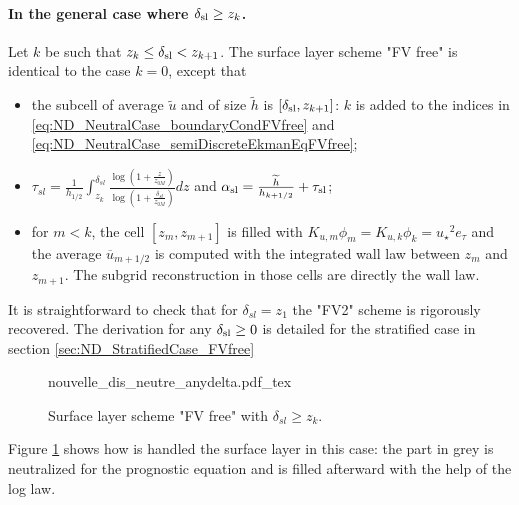 \paragraph{In the general case where $\delta_{\rm sl} \geq z_k$.}
Let $k$ be such that $z_k \leq \delta_{\rm sl} < z_{k+1}$.
The surface layer scheme "FV free" is identical to the case $k=0$, except that
\begin{itemize}
	\item the subcell of average $\widetilde{u}$ and of size
		$\widetilde{h}$ is $[\delta_{\rm sl}, z_{k+1}]$:
		$k$ is added to the indices in 
		\eqref{eq:ND_NeutralCase_boundaryCondFVfree} and
		\eqref{eq:ND_NeutralCase_semiDiscreteEkmanEqFVfree};
	\item $\tau_{sl} = \frac{1}{{h_{1/2}}}\int_{z_k}^{\delta_{sl}} \frac{\log(1+\frac{z}{z_{0M}})}{\log(1+\frac{\delta_{sl}}{z_{0M}})} dz$ and $\alpha_{\rm sl} = \frac{\widetilde{h}}{h_{k+1/2}} + \tau_{\rm sl}$;
	\item for $m < k$, the cell $[z_m, z_{m+1}]$ is filled with
		$K_{u,m} \phi_m = K_{u,k}\phi_k =
	{u_\star}^2e_\tau$
		and the average $\overline{u}_{m+1/2}$
		is computed with the integrated wall law
		between $z_m$ and $z_{m+1}$.
		The subgrid reconstruction in those cells are directly
		the wall law.
\end{itemize}
It is straightforward to check that for $\delta_{sl} = z_1$
the "FV2" scheme is rigorously recovered.
The derivation for any $\delta_{\rm sl} \geq 0$ is detailed for
the stratified case in section \ref{sec:ND_StratifiedCase_FVfree}
\begin{figure}
	{nouvelle_dis_neutre_anydelta.pdf_tex}
	\caption{ Surface layer scheme "FV free" with
	$\delta_{sl} \geq z_k$.}
	\label{fig:ND_NeutralCase_nouvelle_dis_neutre_anydelta}
\end{figure}
Figure \ref{fig:ND_NeutralCase_nouvelle_dis_neutre_anydelta}
shows how is handled the surface layer in this case: the part in grey
is neutralized for the prognostic equation and is filled afterward
with the help of the log law.
